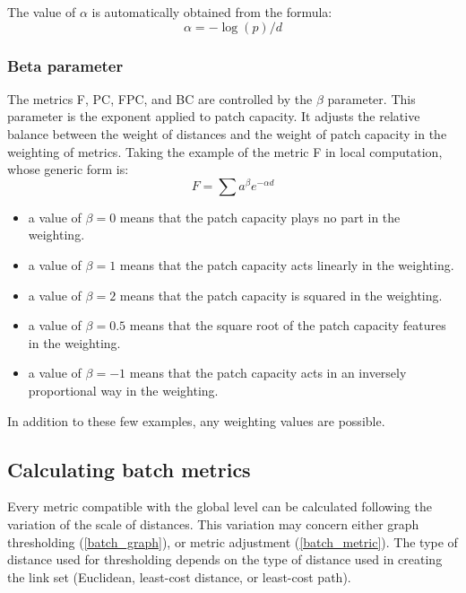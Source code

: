 \documentclass{article}
\begin{document}
The value of $\alpha$ is automatically obtained from the formula:
\begin{equation*}
\alpha =-\log \left(p\right)/{d}
\end{equation*}


\subsubsection{Beta parameter}

The metrics F, PC, FPC, and BC are controlled by the $\beta$ parameter. This parameter is the exponent applied to patch capacity. It adjusts the relative balance between the weight of distances and the weight of patch capacity in the weighting of metrics. Taking the example of the metric F in local computation, whose generic form is:
\begin{equation*}
F=\sum {{a}^{\beta }}{e}^{-\mathit{\alpha d}}
\end{equation*}

\begin{itemize}
	\item a value of $\beta =0$ means that the patch capacity plays no part in the weighting.
	\item a value of $\beta =1$ means that the patch capacity acts linearly in the weighting.
	\item a value of $\beta =2$ means that the patch capacity is squared in the weighting.
	\item a value of $\beta =0.5$ means that the square root of the patch capacity features in the weighting.
	\item a value of $\beta =-1$ means that the patch capacity acts in an inversely proportional way in the weighting.	
\end{itemize}

In addition to these few examples, any weighting values are possible.

\subsection{Calculating batch metrics}

Every metric compatible with the global level can be calculated following the variation of the scale of distances. This variation may concern either graph thresholding (\ref{batch_graph}), or metric adjustment (\ref{batch_metric}). The type of distance used for thresholding depends on the type of distance used in creating the link set (Euclidean, least-cost
distance, or least-cost path).
\end{document}
